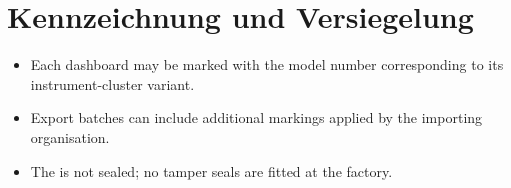 \chapter{Kennzeichnung und Versiegelung}\label{ch:marking}

\begin{itemize}
    \item Each dashboard may be marked with the model number corresponding to its instrument-cluster variant.
    \item Export batches can include additional markings applied by the importing organisation.
    \item The \ReplicaGenOne{} is not sealed; no tamper seals are fitted at the factory.
\end{itemize}
